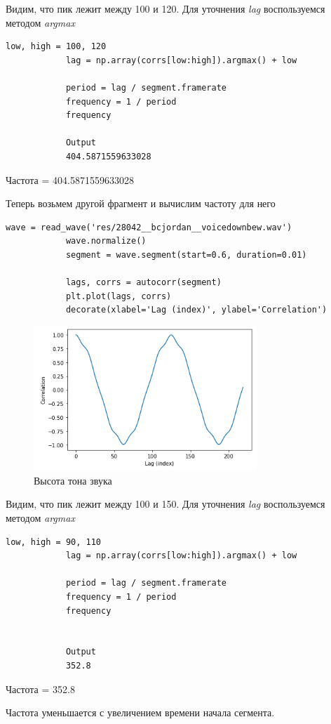 \documentclass[a4paper,12pt]{article}
\begin{document}
\begin{enumerate}
		Видим, что пик лежит между 100 и 120.
		Для уточнения \textit{lag} воспользуемся методом \textit{argmax}
		\begin{lstlisting}[caption=Уточнение частоты]
			low, high = 100, 120
			lag = np.array(corrs[low:high]).argmax() + low
			
			period = lag / segment.framerate
			frequency = 1 / period
			frequency
			
			Output
			404.5871559633028
		\end{lstlisting}
		Частота = 404.5871559633028
			
		Теперь возьмем другой фрагмент и вычислим частоту для него
		\begin{lstlisting}[caption=Фрагмент 2 и высота его тона]
			wave = read_wave('res/28042__bcjordan__voicedownbew.wav')
			wave.normalize()
			segment = wave.segment(start=0.6, duration=0.01)
			
			lags, corrs = autocorr(segment)
			plt.plot(lags, corrs)
			decorate(xlabel='Lag (index)', ylabel='Correlation')
		\end{lstlisting}
		\begin{figure}[H]
			\centering
			\includegraphics[width=0.75\textwidth]{1_2.png}
			\caption{Высота тона звука}
			\label{fig:1.2}
		\end{figure}
		
		Видим, что пик лежит между 100 и 150.
		Для уточнения \textit{lag} воспользуемся методом \textit{argmax}
		\begin{lstlisting}[caption=Уточнение частоты]
			low, high = 90, 110
			lag = np.array(corrs[low:high]).argmax() + low
			
			period = lag / segment.framerate
			frequency = 1 / period
			frequency
			
			
			Output
			352.8
		\end{lstlisting}
		Частота = 352.8
		
		Частота уменьшается с увеличением времени начала сегмента.
		
	\end{enumerate}
	\newpage
\end{document}

